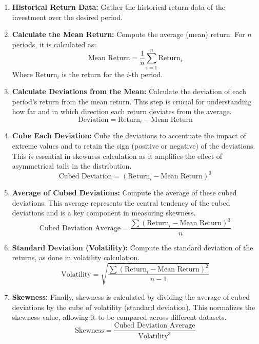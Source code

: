 \documentclass{article}
\begin{document}
\begin{enumerate}
    \item \textbf{Historical Return Data:}
    Gather the historical return data of the investment over the desired period.

    \item \textbf{Calculate the Mean Return:}
        Compute the average (mean) return. For \( n \) periods, it is calculated as:
        \[ \text{Mean Return} = \frac{1}{n} \sum_{i=1}^{n} \text{Return}_i \]
        Where \( \text{Return}_i \) is the return for the \( i \)-th period.

    \item \textbf{Calculate Deviations from the Mean:}
    Calculate the deviation of each period's return from the mean return. This step is crucial for understanding how far and in which direction each return deviates from the average.
    \[ \text{Deviation} = \text{Return}_i - \text{Mean Return} \]

    \item \textbf{Cube Each Deviation:}
    Cube the deviations to accentuate the impact of extreme values and to retain the sign (positive or negative) of the deviations. This is essential in skewness calculation as it amplifies the effect of asymmetrical tails in the distribution.
    \[ \text{Cubed Deviation} = (\text{Return}_i - \text{Mean Return})^3 \]

    \item \textbf{Average of Cubed Deviations:}
    Compute the average of these cubed deviations. This average represents the central tendency of the cubed deviations and is a key component in measuring skewness.
    \[ \text{Cubed Deviation Average} = \frac{\sum (\text{Return}_i - \text{Mean Return})^3}{n} \]

    \item \textbf{Standard Deviation (Volatility):}
    Compute the standard deviation of the returns, as done in volatility calculation.
    \[ \text{Volatility} = \sqrt{\frac{\sum (\text{Return}_i - \text{Mean Return})^2}{n - 1}} \]

    \item \textbf{Skewness:}
    Finally, skewness is calculated by dividing the average of cubed deviations by the cube of volatility (standard deviation). This normalizes the skewness value, allowing it to be compared across different datasets.
    \[ \text{Skewness} = \frac{\text{Cubed Deviation Average}}{\text{Volatility}^3} \]
\end{enumerate}
\end{document}
